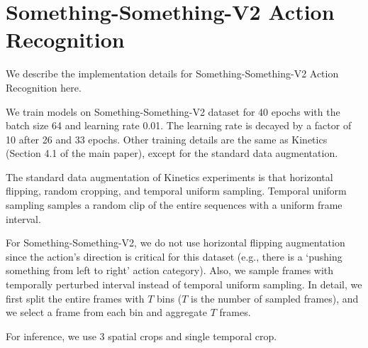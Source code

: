 \section{Something-Something-V2 Action Recognition}
\label{appendix:somethingv2}
We describe the implementation details for Something-Something-V2 Action Recognition here. 

We train models on Something-Something-V2 dataset for 40 epochs with the batch size 64 and learning rate 0.01.
The learning rate is decayed by a factor of 10 after 26 and 33 epochs. 
Other training details are the same as Kinetics (Section 4.1 of the main paper), except for the standard data augmentation. 

The standard data augmentation of Kinetics experiments is that horizontal flipping, random cropping, and temporal uniform sampling. 
Temporal uniform sampling samples a random clip of the entire sequences with a uniform frame interval. 

For Something-Something-V2, we do not use horizontal flipping augmentation since the action's direction is critical for this dataset (e.g., there is  a `pushing something from left to right' action category). 
Also, we sample frames with temporally perturbed interval instead of temporal uniform sampling. 
In detail, we first split the entire frames with $T$ bins ($T$ is the number of sampled frames), and we select a frame from each bin and aggregate $T$ frames.

For inference, we use 3 spatial crops and single temporal crop.